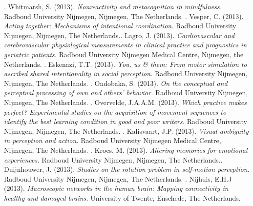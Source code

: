 \npar {}.	Whitmarsh, S. (2013). \emph{Nonreactivity and metacognition in mindfulness.} Radboud University Nijmegen, Nijmegen, The Netherlands.
\npar {}.	Vesper, C. (2013). \emph{Acting together: Mechanisms of intentional coordination.} Radboud University Nijmegen, Nijmegen, The Netherlands.\npar {}.	Lagro, J. (2013). \emph{Cardiovascular and cerebrovascular physiological measurements in clinical practice and prognostics in geriatric patients.} Radboud University Nijmegen Medical Centre, Nijmegen, the Netherlands. \npar {}.	Eskenazi, T.T. (2013). \emph{ You, us \& them: From motor simulation to ascribed shared intentionality in social perception.} Radboud University Nijmegen, Nijmegen, The Netherlands. \npar {}.	Ondobaka, S. (2013). \emph{On the conceptual and perceptual processing of own and others' behavior.} Radboud University Nijmegen, Nijmegen, The Netherlands. \npar {}.	Overvelde, J.A.A.M. (2013). \emph{Which practice makes perfect? Experimental studies on the acquisition of movement sequences to identify the best learning condition in good and poor writers.} Radboud University Nijmegen, Nijmegen, The Netherlands. \npar {}.	Kalisvaart, J.P. (2013). \emph{Visual ambiguity in perception and action.} Radboud University Nijmegen Medical Centre, Nijmegen, The Netherlands. \npar {}.	Kroes, M. (2013). \emph{Altering memories for emotional experiences.} Radboud University Nijmegen, Nijmegen, The Netherlands.\npar {}.	Duijnhouwer, J. (2013). \emph{ Studies on the rotation problem in self-motion perception.} Radboud University Nijmegen, Nijmegen, The Netherlands.
\npar {}.	Nijhuis, E.H.J (2013). \emph{ Macroscopic networks in the human brain: Mapping connectivity in healthy and damaged brains.} University of Twente, Enschede, The Netherlands.
